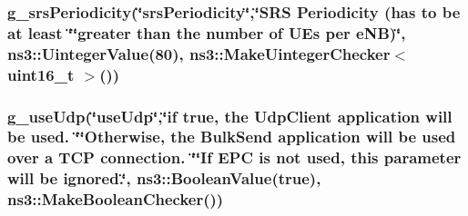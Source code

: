 \subsubsection[{\texorpdfstring{g\+\_\+srs\+Periodicity}{g_srsPeriodicity}}]{ g\+\_\+srs\+Periodicity(\char`\"{}srs\+Periodicity\char`\"{},\char`\"{}S\+RS Periodicity (has to be at least \char`\"{}\char`\"{}greater than the number of U\+Es per e\+NB)\char`\"{}, ns3\+::\+Uinteger\+Value(80), {\bf ns3\+::\+Make\+Uinteger\+Checker}$<$ uint16\+\_\+t $>$())\hspace{0.3cm}{\ttfamily [static]}}\hypertarget{lena-dual-stripe_8cc_af41aa01898f8111e47e8720de056e297}{}\label{lena-dual-stripe_8cc_af41aa01898f8111e47e8720de056e297}
\subsubsection[{\texorpdfstring{g\+\_\+use\+Udp}{g_useUdp}}]{ g\+\_\+use\+Udp(\char`\"{}use\+Udp\char`\"{},\char`\"{}{\bf if} true, the {\bf Udp\+Client} application will be used. \char`\"{}\char`\"{}Otherwise, the Bulk\+Send application will be used over a T\+CP connection. \char`\"{}\char`\"{}If E\+PC is not used, this parameter will be ignored.\char`\"{}, ns3\+::\+Boolean\+Value(true), ns3\+::\+Make\+Boolean\+Checker())\hspace{0.3cm}{\ttfamily [static]}}\hypertarget{lena-dual-stripe_8cc_ad732cd203feb4fd159b65c70f2f14458}{}\label{lena-dual-stripe_8cc_ad732cd203feb4fd159b65c70f2f14458}

